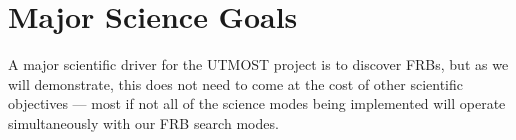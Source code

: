 \section{Major Science Goals}

A major scientific driver for the UTMOST project is to discover FRBs, but as we will demonstrate, this does not need to come at the cost of other scientific objectives — most if not all of the science modes being implemented will operate simultaneously with our FRB search modes.